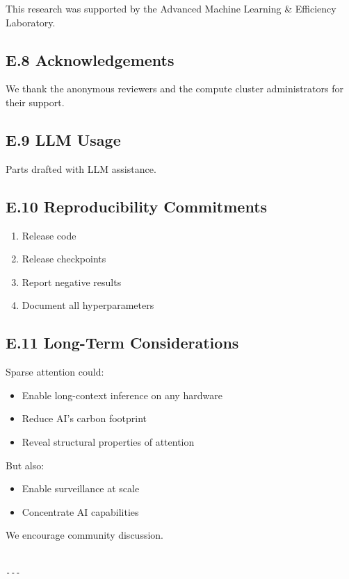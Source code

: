 This research was supported by the Advanced Machine Learning \& Efficiency Laboratory.

\subsection{E.8 Acknowledgements}

We thank the anonymous reviewers and the compute cluster administrators for their support.

\subsection{E.9 LLM Usage}

Parts drafted with LLM assistance.

\subsection{E.10 Reproducibility Commitments}

\begin{enumerate}
\item Release code
\item Release checkpoints
\item Report negative results
\item Document all hyperparameters

\end{enumerate}
\subsection{E.11 Long-Term Considerations}

Sparse attention could:

\begin{itemize}
\item Enable long-context inference on any hardware
\item Reduce AI's carbon footprint
\item Reveal structural properties of attention

\end{itemize}
But also:

\begin{itemize}
\item Enable surveillance at scale
\item Concentrate AI capabilities

\end{itemize}
We encourage community discussion.
\begin{lstlisting}

---
\end{lstlisting}


